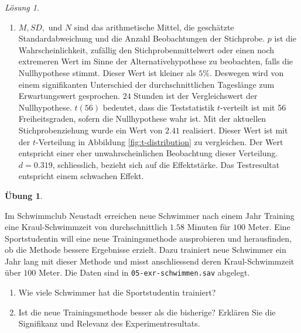 \documentclass[
]{book}
\providecommand{\tightlist}{%
  \setlength{\itemsep}{0pt}\setlength{\parskip}{0pt}}
\theoremstyle{definition}
\theoremstyle{definition}
\theoremstyle{definition}
\newtheorem{exercise}{Übung}[chapter]
\theoremstyle{definition}
\theoremstyle{remark}
\newtheorem*{solution}{Lösung}
\begin{document}
\begin{solution}
\begin{enumerate}
\def\labelenumi{\alph{enumi})}
\setcounter{enumi}{2}
\tightlist
\item
  \(M, SD,\) und \(N\) sind das arithmetische Mittel, die geschätzte Standardabweichung und die Anzahl Beobachtungen der Stichprobe. \(p\) ist die Wahrscheinlichkeit, zufällig den Stichprobenmittelwert oder einen noch extremeren Wert im Sinne der Alternativehypothese zu beobachten, falls die Nullhypothese stimmt. Dieser Wert ist kleiner als \(5\%\). Deswegen wird von einem signifikanten Unterschied der durchschnittlichen Tageslänge zum Erwartungswert gesprochen. \(24\) Stunden ist der Vergleichswert der Nullhypothese. \(t(56)\) bedeutet, dass die Teststatistik \(t\)-verteilt ist mit 56 Freiheitsgraden, sofern die Nullhypothese wahr ist. Mit der aktuellen Stichprobenziehung wurde ein Wert von \(2.41\) realisiert. Dieser Wert ist mit der \(t\)-Verteilung in Abbildung \ref{fig:t-distribution} zu vergleichen. Der Wert entspricht einer eher unwahrscheinlichen Beobachtung dieser Verteilung. \(d = 0.319\), schliesslich, bezieht sich auf die Effektstärke. Das Testresultat entspricht einem schwachen Effekt.
\end{enumerate}

\end{solution}

\begin{exercise}
\protect\hypertarget{exr:schwimmen}{}\label{exr:schwimmen}\leavevmode

Im Schwimmclub Neustadt erreichen neue Schwimmer nach einem Jahr Training eine Kraul-Schwimmzeit von durchschnittlich \(1.58\) Minuten für \(100\) Meter. Eine Sportstudentin will eine neue Trainingsmethode ausprobieren und herausfinden, ob die Methode bessere Ergebnisse erzielt. Dazu trainiert neue Schwimmer ein Jahr lang mit dieser Methode und misst anschliessend deren Kraul-Schwimmzeit über \(100\) Meter. Die Daten sind in \texttt{05-exr-schwimmen.sav} abgelegt.

\begin{enumerate}
\def\labelenumi{\alph{enumi})}
\tightlist
\item
  Wie viele Schwimmer hat die Sportstudentin trainiert?
\item
  Ist die neue Trainingsmethode besser als die bisherige? Erklären Sie die Signifikanz und Relevanz des Experimentresultats.
\end{enumerate}

\end{exercise}
\end{document}
